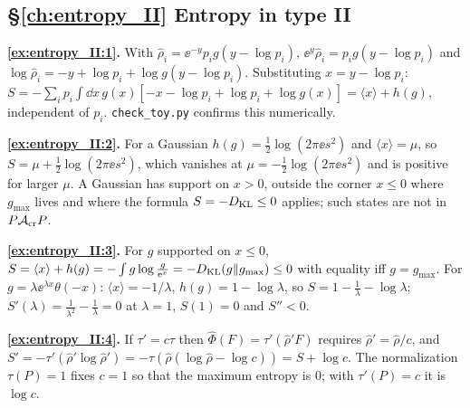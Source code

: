 {\subsection*{\S\ref{ch:entropy_II} Entropy in type II}
\textbf{\ref{ex:entropy_II:1}.} With $\hat\rho_i=\ee^{-y}p_ig(y-\log p_i)$, $\ee^y\hat\rho_i=p_ig(y-\log p_i)$ and $\log\hat\rho_i=-y+\log p_i+\log g(y-\log p_i)$. Substituting $x=y-\log p_i$: $S=-\sum_ip_i\int\dd x\,g(x)[-x-\log p_i+\log p_i+\log g(x)]=\langle x\rangle+h(g)$, independent of $p_i$. \texttt{check\_toy.py} confirms this numerically.\par
\textbf{\ref{ex:entropy_II:2}.} For a Gaussian $h(g)=\frac12\log(2\pi\ee s^2)$ and $\langle x\rangle=\mu$, so $S=\mu+\frac12\log(2\pi\ee s^2)$, which vanishes at $\mu=-\frac12\log(2\pi\ee s^2)$ and is positive for larger $\mu$. A Gaussian has support on $x>0$, outside the corner $x\le0$ where $g_{\max}$ lives and where the formula $S=-D_{\rm KL}\le0$ applies; such states are not in $P\mathcal{A}_{\rm cr}P$.\par
\textbf{\ref{ex:entropy_II:3}.} For $g$ supported on $x\le0$, $S=\langle x\rangle+h(g)=-\int g\log\frac g{\mathrm{e}^{x}}=-D_{\rm KL}(g\|g_{\max})\le0$ with equality iff $g=g_{\max}$. For $g=\lambda\ee^{\lambda x}\theta(-x)$: $\langle x\rangle=-1/\lambda$, $h(g)=1-\log\lambda$, so $S=1-\frac1\lambda-\log\lambda$; $S'(\lambda)=\frac1{\lambda^2}-\frac1\lambda=0$ at $\lambda=1$, $S(1)=0$ and $S''<0$.\par
\textbf{\ref{ex:entropy_II:4}.} If $\tau'=c\tau$ then $\hat\Phi(F)=\tau'(\hat\rho'F)$ requires $\hat\rho'=\hat\rho/c$, and $S'=-\tau'(\hat\rho'\log\hat\rho')=-\tau(\hat\rho(\log\hat\rho-\log c))=S+\log c$. The normalization $\tau(P)=1$ fixes $c=1$ so that the maximum entropy is $0$; with $\tau'(P)=c$ it is $\log c$.\par

}
